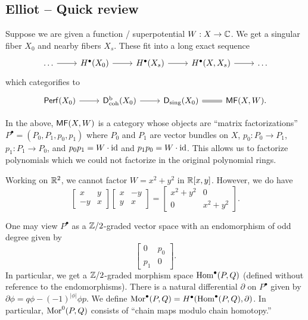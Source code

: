 \documentclass{article}
\begin{document}
\subsection{Elliot -- Quick review}

Suppose we are given a function / superpotential $W: X \to \mathbb{C}$.
We get a singular fiber $X_0$ and nearby fibers $X_s$.
These fit into a long exact sequence
\[
	\begin{tikzcd}
		\dots \rar & H^\bullet(X_0) \rar & H^\bullet(X_s) \rar & H^\bullet(X, X_s) \rar & \dots
	\end{tikzcd}
\]
which categorifies to
\[
	\begin{tikzcd}
		\Perf(X_0) \rar & \Dbcoh(X_0) \rar & \Dsing(X_0) \rar[equal] & \MF(X, W).
	\end{tikzcd}
\]

In the above, $\mathsf{MF}(X, W)$ is a category whose objects are ``matrix factorizations'' $P^\bullet = (P_0, P_1, p_0, p_1)$ where $P_0$ and $P_1$ are vector bundles on $X$, $p_0: P_0 \to P_1$, $p_1: P_1 \to P_0$, and $p_0 p_1 = W \cdot \operatorname{id}$ and $p_1 p_0 = W \cdot \operatorname{id}$.
This allows us to factorize polynomials which we could not factorize in the original polynomial rings.

\begin{ex}
	Working on $\mathbb{R}^2$, we cannot factor $W = x^2 + y^2$ in $\mathbb{R}[x, y]$.
	However, we do have
	\[
		\begin{bmatrix}
			x & y \\
			-y & x
		\end{bmatrix}
		\begin{bmatrix}
			x & -y \\
			y & x
		\end{bmatrix}
		=
		\begin{bmatrix}
			x^2 + y^2 & 0 \\
			0 & x^2 + y^2
		\end{bmatrix}.
	\]
\end{ex}

One may view $P^\bullet$ as a $\mathbb{Z}/2$-graded vector space with an endomorphism of odd degree given by
\[
	\begin{bmatrix}
		0 & p_0 \\
		p_1 & 0
	\end{bmatrix}.
\]
In particular, we get a $\mathbb{Z}/2$-graded morphism space $\operatorname{Hom}^\bullet(P, Q)$ (defined without reference to the endomorphisms).
There is a natural differential $\partial$ on $P^\bullet$ given by $\partial \phi = q \phi - (-1)^{|\phi|} \phi p$.
We define $\operatorname{Mor}^\bullet(P, Q) = H^\bullet(\operatorname{Hom}^\bullet(P, Q), \partial)$.
In particular, $\operatorname{Mor}^0(P, Q)$ consists of ``chain maps modulo chain homotopy.''
\end{document}
